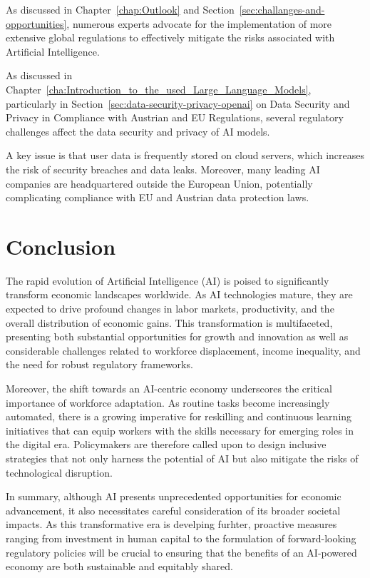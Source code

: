 As discussed in Chapter~\ref{chap:Outlook} and Section~\ref{sec:challanges-and-opportunities}, numerous experts advocate for the implementation of more extensive global regulations to effectively mitigate the risks associated with Artificial Intelligence.


As discussed in Chapter~\ref{cha:Introduction_to_the_used_Large_Language_Models}, particularly in Section~\ref{sec:data-security-privacy-openai} on Data Security and Privacy in Compliance with Austrian and EU Regulations, several regulatory challenges affect the data security and privacy of AI models.

A key issue is that user data is frequently stored on cloud servers, which increases the risk of security breaches and data leaks. Moreover, many leading AI companies are headquartered outside the European Union, potentially complicating compliance with EU and Austrian data protection laws.


\section{Conclusion}
\label{sec:conclusion}

The rapid evolution of Artificial Intelligence (AI) is poised to significantly transform economic landscapes worldwide. 
As AI technologies mature, they are expected to drive profound changes in labor markets, productivity, and the overall distribution of economic gains. 
This transformation is multifaceted, presenting both substantial opportunities for growth and innovation as well as considerable challenges related to workforce displacement,
income inequality, and the need for robust regulatory frameworks.

Moreover, the shift towards an AI-centric economy underscores the critical importance of workforce adaptation. 
As routine tasks become increasingly automated, there is a growing imperative for reskilling and continuous learning initiatives that can equip workers with the skills 
necessary for emerging roles in the digital era. Policymakers are therefore called upon to design inclusive strategies that not only harness the potential 
of AI but also mitigate the risks of technological disruption.

In summary, although AI presents unprecedented opportunities for economic advancement, 
it also necessitates careful consideration of its broader societal impacts. As this transformative era is develping furhter, 
proactive measures ranging from investment in human capital to the formulation of forward-looking regulatory policies 
will be crucial to ensuring that the benefits of an AI-powered economy are both sustainable and equitably shared.
